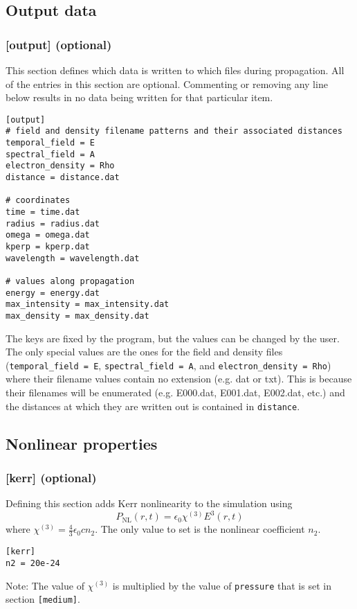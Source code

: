 \documentclass{article}
\begin{document}
\subsection{Output data}
\subsubsection{[output] (optional)}
This section defines which data is written to which files during
propagation.  All of the entries in this section are
optional. Commenting or removing any line below results in no data
being written for that particular item.
\begin{lstlisting}
[output]
# field and density filename patterns and their associated distances
temporal_field = E
spectral_field = A
electron_density = Rho
distance = distance.dat

# coordinates
time = time.dat
radius = radius.dat
omega = omega.dat
kperp = kperp.dat
wavelength = wavelength.dat

# values along propagation
energy = energy.dat
max_intensity = max_intensity.dat
max_density = max_density.dat
\end{lstlisting}

The keys are fixed by the program, but the values can be changed by
the user.  The only special values are the ones for the field and
density files (\texttt{temporal\_field = E}, \texttt{spectral\_field =
  A}, and \texttt{electron\_density = Rho}) where their filename values
contain no extension (e.g. dat or txt). This is because their
filenames will be enumerated (e.g. E000.dat, E001.dat, E002.dat, etc.)
and the distances at which they are written out is contained in
\texttt{distance}.

\subsection{Nonlinear properties}
\subsubsection{[kerr] (optional)}
Defining this section adds Kerr nonlinearity to the simulation using
\[P_{\mathrm{NL}}(r, t) = \epsilon_0 \chi^{(3)} E^3(r,t)\] where
$\chi^{(3)} = \frac43 \epsilon_0 c n_2$. The only value to set is the
nonlinear coefficient $n_2$.
\begin{lstlisting}
[kerr]
n2 = 20e-24
\end{lstlisting}
Note: The value of $\chi^{(3)}$ is multiplied by the value of
\texttt{pressure} that is set in section \texttt{[medium]}.
\end{document}
